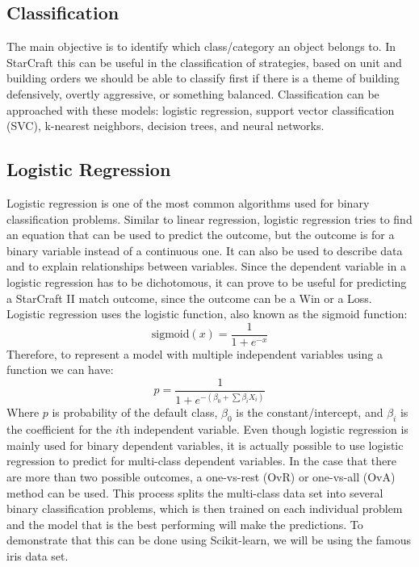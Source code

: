 \documentclass[a4paper,12pt]{report}
\begin{document}
\subsection{Classification}

The main objective is to identify which class/category an object belongs to. In StarCraft this can be useful in the classification of strategies, based on unit and building orders we should be able to classify first if there is a theme of building defensively, overtly aggressive, or something balanced. Classification can be approached with these models: logistic regression, support vector classification (SVC), k-nearest neighbors, decision trees, and neural networks.

\subsection{Logistic Regression}

Logistic regression is one of the most common algorithms used for binary classification problems. Similar to linear regression, logistic regression tries to find an equation that can be used to predict the outcome, but the outcome is for a binary variable instead of a continuous one. It can also be used to describe data and to explain relationships between variables. Since the dependent variable in a logistic regression  has to be dichotomous, it can prove to be useful for predicting a StarCraft II match outcome, since the outcome can be a Win or a Loss. Logistic regression uses the logistic function, also known as the sigmoid function:
$$\text{sigmoid}(x) = \frac{1}{1+e^{-x}}$$
Therefore, to represent a model with multiple independent variables using a function we can have:
$$p = \frac{1}{1+e^{-(\beta_0+\sum\beta_iX_i)}}$$
Where $p$ is probability of the default class, $\beta_0$ is the constant/intercept, and $\beta_i$ is the coefficient for the $i$th independent variable. Even though logistic regression is mainly used for binary dependent variables, it is actually possible to use logistic regression to predict for multi-class dependent variables. In the case that there are more than two possible outcomes, a one-vs-rest (OvR) or one-vs-all (OvA) method can be used. This process splits the multi-class data set into several binary classification problems, which is then trained on each individual problem and the model that is the best performing will make the predictions. To demonstrate that this can be done using Scikit-learn, we will be using the famous iris data set.
\end{document}
